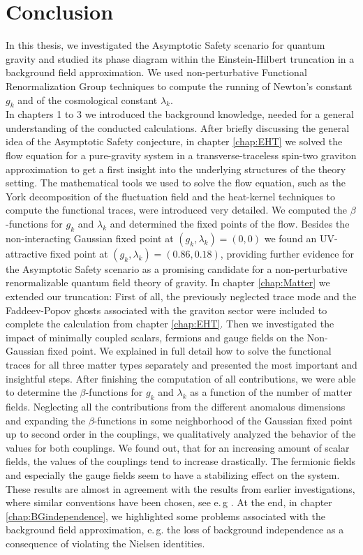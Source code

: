 \chapter{Conclusion}\label{chap:Conclusion}
In this thesis, we investigated the Asymptotic Safety scenario for quantum gravity and studied its phase diagram within the Einstein-Hilbert truncation in a background field approximation. We used non-perturbative Functional Renormalization Group techniques to compute the running of Newton's constant $g_k$ and of the cosmological constant $\lambda_k$.  \\

In chapters 1 to 3 we introduced the background knowledge, needed for a general understanding of the conducted calculations. After briefly discussing the general idea of the Asymptotic Safety conjecture, in chapter \ref{chap:EHT} we solved the flow equation for a pure-gravity system in a transverse-traceless spin-two graviton approximation to get a first insight into the underlying structures of the theory setting. The mathematical tools we used to solve the flow equation, such as the York decomposition of the fluctuation field and the heat-kernel techniques to compute the functional traces, were introduced very detailed. We computed the $\beta$-functions for $g_k$ and $\lambda_k$ and determined the fixed points of the flow. Besides the non-interacting Gaussian fixed point at $(g_k, \lambda_k)=(0, 0)$ we found an UV-attractive fixed point at $(g_k, \lambda_k)=(0.86, 0.18)$, providing further evidence for the Asymptotic Safety scenario as a promising candidate for a non-perturbative renormalizable quantum field theory of gravity. In chapter \ref{chap:Matter} we extended our truncation: First of all, the previously neglected trace mode and the Faddeev-Popov ghosts associated with the graviton sector were included to complete the calculation from chapter \ref{chap:EHT}. Then we investigated the impact of minimally coupled scalars, fermions and gauge fields on the Non-Gaussian fixed point. We explained in full detail how to solve the functional traces for all three matter types separately and presented the most important and insightful steps. After finishing the computation of all contributions, we were able to determine the $\beta$-functions for $g_k$ and $\lambda_k$ as a function of the number of matter fields. Neglecting all the contributions from the different anomalous dimensions and expanding the $\beta$-functions in some neighborhood of the Gaussian fixed point up to second order in the couplings, we qualitatively analyzed the behavior of the values for both couplings. We found out, that for an increasing amount of scalar fields, the values of the couplings tend to increase drastically. The fermionic fields and especially the gauge fields seem to have a stabilizing effect on the system. These results are almost in agreement with the results from earlier investigations, where similar conventions have been chosen, see e.\,g \cite{DonaEichhornPercacci2013}.
At the end, in chapter \ref{chap:BGindependence}, we highlighted some problems associated with the background field approximation, e.\,g. the loss of background independence as a consequence of violating the Nielsen identities. \\

